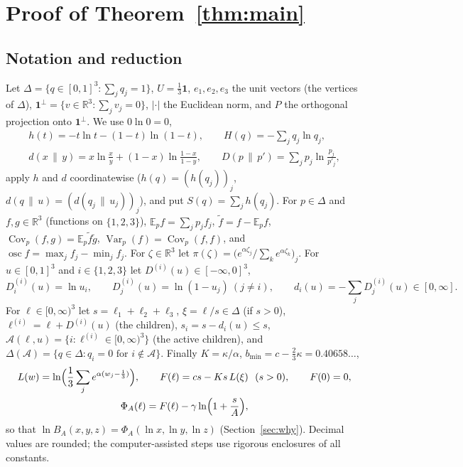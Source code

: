 \documentclass[11pt]{article}
\theoremstyle{definition}
\numberwithin{equation}{section}
\newcommand{\one}{\mathbf 1}
\newcommand{\R}{\mathbb R}
\newcommand{\KLb}[2]{d(#1\,\|\,#2)}
\newcommand{\KL}[2]{D(#1\,\|\,#2)}
\newcommand{\cA}{\mathcal A}
\newcommand{\Var}{\operatorname{Var}}
\newcommand{\Cov}{\operatorname{Cov}}
\newcommand{\osc}{\operatorname{osc}}
\newcommand{\bmin}{b_{\min}}
\begin{document}
\section{\texorpdfstring{Proof of Theorem~\ref{thm:main}}{Proof of the theorem}}\label{app:proof}
\subsection{Notation and reduction}\label{sec:red}
Let $\Delta=\{q\in[0,1]^3:\sum_jq_j=1\}$, $U=\frac13\one$, $e_1,e_2,e_3$ the unit vectors (the vertices of $\Delta$),
$\one^\perp=\{v\in\R^3:\sum_jv_j=0\}$, $|\cdot|$ the Euclidean norm, and $P$ the orthogonal projection onto $\one^\perp$. We use
$0\ln0=0$,
\begin{gather*}
h(t)=-t\ln t-(1-t)\ln(1-t),\qquad H(q)=-\sum_jq_j\ln q_j,\\
\KLb xy=x\ln\frac xy+(1-x)\ln\frac{1-x}{1-y},\qquad \KL p{p'}=\sum_jp_j\ln\frac{p_j}{p'_j},
\end{gather*}
apply $h$ and $d$ coordinatewise ($h(q)=(h(q_j))_j$, $\KLb qu=(\KLb{q_j}{u_j})_j$), and put $S(q)=\sum_jh(q_j)$. For $p\in\Delta$ and
$f,g\in\R^3$ (functions on $\{1,2,3\}$), $\mathbb E_pf=\sum_jp_jf_j$, $\tilde f=f-\mathbb E_pf$, $\Cov_p(f,g)=\mathbb E_p\tilde f\tilde g$,
$\Var_p(f)=\Cov_p(f,f)$, and $\osc f=\max_jf_j-\min_jf_j$. For $\zeta\in\R^3$ let $\pi(\zeta)=\bigl(e^{\alpha\zeta_j}/\sum_ke^{\alpha\zeta_k}\bigr)_j$.
For $u\in[0,1]^3$ and $i\in\{1,2,3\}$ let $D^{(i)}(u)\in[-\infty,0]^3$,
\[
D^{(i)}_i(u)=\ln u_i,\qquad D^{(i)}_j(u)=\ln(1-u_j)\ (j\ne i),\qquad d_i(u)=-\textstyle\sum_jD^{(i)}_j(u)\in[0,\infty].
\]
For $\ell\in[0,\infty)^3$ let $s=\ell_1+\ell_2+\ell_3$, $\xi=\ell/s\in\Delta$ (if $s>0$), $\ell^{(i)}=\ell+D^{(i)}(u)$ (the children),
$s_i=s-d_i(u)\le s$, $\cA(\ell,u)=\{i:\ell^{(i)}\in[0,\infty)^3\}$ (the active children), and $\Delta(\cA)=\{q\in\Delta:q_i=0\text{ for }i\notin\cA\}$.
Finally $K=\kappa/\alpha$, $\bmin=c-\frac23\kappa=0.40658\ldots$,
\begin{gather*}
L(w)=\ln\Bigl(\frac13\sum_je^{\alpha(w_j-\frac13)}\Bigr),\qquad F(\ell)=cs-Ks\,L(\xi)\ \ (s>0),\qquad F(0)=0,\\
\Phi_A(\ell)=F(\ell)-\gamma\ln\Bigl(1+\frac sA\Bigr),
\end{gather*}
so that $\ln B_A(x,y,z)=\Phi_A(\ln x,\ln y,\ln z)$ (Section~\ref{sec:why}). Decimal values are rounded; the computer-assisted steps use rigorous
enclosures of all constants.
\end{document}
